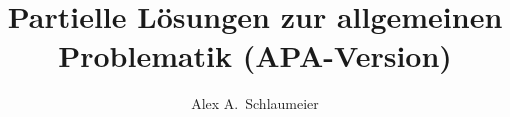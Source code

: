 \documentclass[master,german,smartquotes,apa]{hgbthesis}
\begin{document}


\title{Partielle Lösungen zur allgemeinen Problematik (APA-Version)}
\author{Alex A.\ Schlaumeier}





\frontmatter                                       %

\maketitle
\tableofcontents

		
			

\mainmatter                             %










\appendix                                                               %

\end{document}
